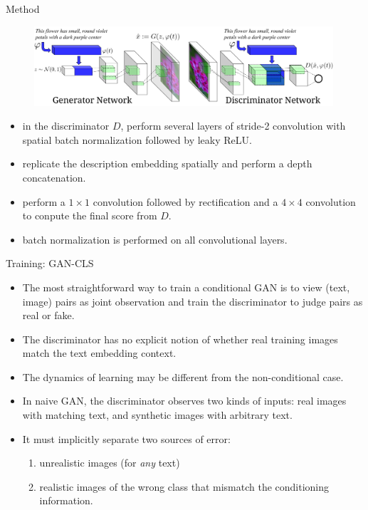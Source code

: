 \documentclass[10pt]{beamer}
\begin{document}
	\begin{frame}[t]{Method}
		\begin{figure}
			\includegraphics[width=30em]{figures/image-synthesis-structure.png}
		\end{figure}
		\begin{itemize}
			\item in the discriminator $D$, perform several layers of stride-2 convolution with spatial batch normalization followed by leaky ReLU.
			\item replicate the description embedding spatially and perform a depth concatenation.
			\item perform a $1\times1$ convolution followed by rectification and a $4\times4$ convolution to conpute the final score from $D$.
			\item batch normalization is performed on all convolutional layers.
		\end{itemize}
	\end{frame}
	
	\begin{frame}{Training: GAN-CLS}
		\begin{itemize}
			\item The most straightforward way to train a conditional GAN is to view (text, image) pairs as joint observation and train the discriminator to judge pairs as real or fake.
			\item The discriminator has no explicit notion of whether real training images match the text embedding context.
			\item The dynamics of learning may be different from the non-conditional case.
			\item In naive GAN, the discriminator observes two kinds of inputs: real images with matching text, and synthetic images with arbitrary text.
			\item It must implicitly separate two sources of error:
			\begin{enumerate}
				\item unrealistic images (for \emph{any} text)
				\item realistic images of the wrong class that mismatch the conditioning information.
			\end{enumerate}
		\end{itemize} 
	\end{frame}
\end{document}
